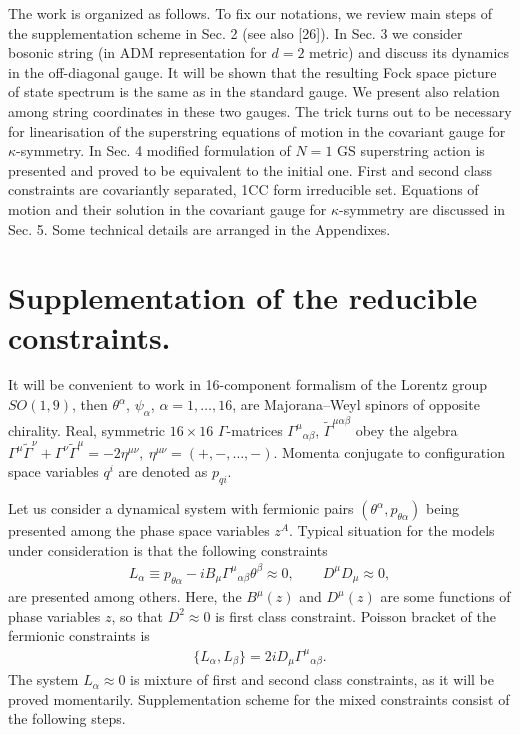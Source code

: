 \documentclass[a4paper]{article}
\begin{document}
The work is organized as follows. To fix our notations, we review main 
steps of the supplementation scheme in Sec. 2 (see also [26]). 
In Sec. 3 we consider bosonic string (in ADM representation for $d=2$ 
metric) and discuss its dynamics in the off-diagonal gauge. It will be 
shown that the resulting Fock space picture of state spectrum is the 
same as in the standard gauge. We present also relation among string 
coordinates in these two gauges. The trick turns out to be necessary 
for linearisation of the superstring equations of motion in the 
covariant gauge for $\kappa$-symmetry. In Sec. 4 modified formulation 
of $N=1$ GS superstring action is presented and proved to be 
equivalent to the initial one. First and second class constraints are 
covariantly separated, 1CC form irreducible set. Equations of motion 
and their solution in the covariant gauge for $\kappa$-symmetry are 
discussed in Sec. 5. Some technical details are arranged in the 
Appendixes.  

\section{Supplementation of the reducible constraints.} 

It will be convenient to work in 16-component formalism of the Lorentz
group $SO(1, 9)$,
then $\theta^\alpha$, $\psi_\alpha$, $\alpha=1,\dots,16$, are
Majorana--Weyl spinors of opposite chirality. Real, symmetric
$16\times16$ $\Gamma$-matrices ${\Gamma^\mu}_{\alpha\beta}$,
$\tilde\Gamma^{\mu\alpha\beta}$ obey the algebra
$\Gamma^\mu\tilde\Gamma^\nu+\Gamma^\nu\tilde\Gamma^\mu=-2\eta^{\mu\nu},
~ \eta^{\mu\nu}=(+,-, \ldots ,-)$.
Momenta conjugate to configuration space variables $q^i$
are denoted as $p_{qi}$.

Let us consider a dynamical system with fermionic pairs $(\theta^\alpha,
p_{\theta\alpha})$ being presented among the phase space variables $z^A$.
Typical situation for the models under consideration is that the following
constraints
\begin{eqnarray}\label{1}
L_\alpha\equiv p_{\theta\alpha}- iB_\mu{\Gamma^\mu}_{\alpha\beta}
\theta^\beta\approx 0, \qquad D^\mu D_\mu\approx0,
\end{eqnarray}
are presented among others.
Here, the $B^\mu(z)$ and $D^\mu(z)$ are some functions of phase variables
$z$, so that $D^2\approx0$ is first class constraint.
Poisson bracket of the fermionic constraints is
\begin{eqnarray}\label{2}
\{L_\alpha,L_\beta\}=2iD_\mu{\Gamma^\mu}_{\alpha\beta}.
\end{eqnarray}
The system $L_\alpha\approx0$ is mixture of first and second class
constraints, as it will be proved momentarily. Supplementation scheme
for the mixed constraints consist of the following steps.
\end{document}
